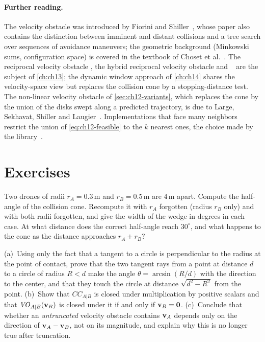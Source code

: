 \paragraph{Further reading.}
The velocity obstacle was introduced by Fiorini and
Shiller~\cite{fiorini1998motion}, whose paper also contains the distinction
between imminent and distant collisions and a tree search over sequences of
avoidance maneuvers; the geometric background (Minkowski sums,
configuration space) is covered in the textbook of Choset et
al.~\cite{choset2005principles}. The reciprocal velocity obstacle
\cite{vandenberg2008rvo}, the hybrid reciprocal velocity obstacle
\cite{snape2011hrvo} and \orca~\cite{vandenberg2011orca} are the subject of
\cref{ch:ch13}; the dynamic window approach of \cref{ch:ch14} shares the
velocity-space view but replaces the collision cone by a stopping-distance
test. The non-linear velocity obstacle of \cref{sec:ch12-variants}, which
replaces the cone by the union of the disks swept along a predicted
trajectory, is due to Large, Sekhavat, Shiller and
Laugier~\cite{large2002nonlinear}. Implementations that face many neighbors
restrict the union of \cref{eq:ch12-feasible} to the $k$ nearest ones, the
choice made by the \orca library~\cite{vandenberg2011orca}.

\section{Exercises}
\label{sec:ch12-exercises}

\begin{exercise}[\difficulty{1}]
\label{exr:ch12-halfangle}
Two drones of radii $r_A = 0.3\,\mathrm{m}$ and $r_B = 0.5\,\mathrm{m}$ are
$4\,\mathrm{m}$ apart. Compute the half-angle of the collision cone. Recompute
it with $r_A$ forgotten (radius $r_B$ only) and with both radii forgotten, and
give the width of the wedge in degrees in each case. At what distance does the
correct half-angle reach $30^\circ$, and what happens to the cone as the
distance approaches $r_A + r_B$?
\end{exercise}

\begin{exercise}
\label{exr:ch12-tangent}
(a)~Using only the fact that a tangent to a circle is perpendicular to the
radius at the point of contact, prove that the two tangent rays from a point
at distance $d$ to a circle of radius $R < d$ make the angle
$\theta = \arcsin(R/d)$ with the direction to the center, and that they touch
the circle at distance $\sqrt{d^2 - R^2}$ from the point. (b)~Show that
$CC_{A|B}$ is closed under multiplication by positive scalars and that
$\mathit{VO}_{A|B}(\mathbf{v}_B)$ is closed under it if and only if $\mathbf{v}_B = \mathbf{0}$.
(c)~Conclude that whether an \emph{untruncated} velocity obstacle contains
$\mathbf{v}_A$ depends only on the direction of $\mathbf{v}_A - \mathbf{v}_B$, not on its
magnitude, and explain why this is no longer true after truncation.
\end{exercise}

